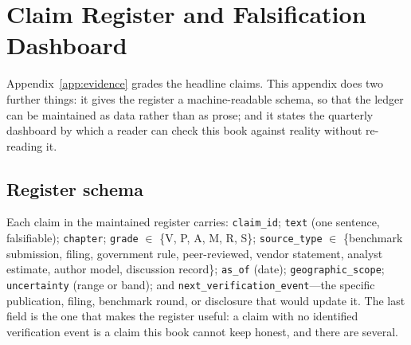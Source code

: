 \chapter{Claim Register and Falsification Dashboard}
\label{app:dashboard}

Appendix~\ref{app:evidence} grades the headline claims. This appendix does two further things: it gives the register a machine-readable schema, so that the ledger can be maintained as data rather than as prose; and it states the quarterly dashboard by which a reader can check this book against reality without re-reading it.

\section{Register schema}

Each claim in the maintained register carries: \texttt{claim\_id}; \texttt{text} (one sentence, falsifiable); \texttt{chapter}; \texttt{grade} $\in$ \{V, P, A, M, R, S\}; \texttt{source\_type} $\in$ \{benchmark submission, filing, government rule, peer-reviewed, vendor statement, analyst estimate, author model, discussion record\}; \texttt{as\_of} (date); \texttt{geographic\_scope}; \texttt{uncertainty} (range or band); and \texttt{next\_verification\_event}---the specific publication, filing, benchmark round, or disclosure that would update it. The last field is the one that makes the register useful: a claim with no identified verification event is a claim this book cannot keep honest, and there are several.

